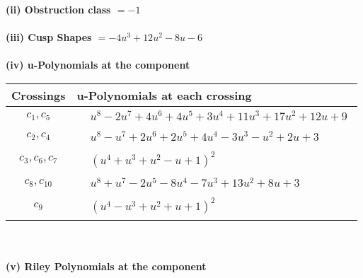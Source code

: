 \documentclass[1p]{elsarticle_modified}
\theoremstyle{definition}
\begin{document}
\flushleft \textbf{(ii) Obstruction class $= -1$}\\~\\
\flushleft \textbf{(iii) Cusp Shapes $= -4 u^3+12 u^2-8 u-6$}\\~\\
\newpage\renewcommand{\arraystretch}{1}
\flushleft \textbf{(iv) u-Polynomials at the component}\newline \\
\begin{tabular}{m{50pt}|m{274pt}}
Crossings & \hspace{64pt}u-Polynomials at each crossing \\
\hline $$\begin{aligned}c_{1},c_{5}\end{aligned}$$&$\begin{aligned}
&u^8-2 u^7+4 u^6+4 u^5+3 u^4+11 u^3+17 u^2+12 u+9
\end{aligned}$\\
\hline $$\begin{aligned}c_{2},c_{4}\end{aligned}$$&$\begin{aligned}
&u^8- u^7+2 u^6+2 u^5+4 u^4-3 u^3- u^2+2 u+3
\end{aligned}$\\
\hline $$\begin{aligned}c_{3},c_{6},c_{7}\end{aligned}$$&$\begin{aligned}
&(u^4+u^3+u^2- u+1)^2
\end{aligned}$\\
\hline $$\begin{aligned}c_{8},c_{10}\end{aligned}$$&$\begin{aligned}
&u^8+u^7-2 u^5-8 u^4-7 u^3+13 u^2+8 u+3
\end{aligned}$\\
\hline $$\begin{aligned}c_{9}\end{aligned}$$&$\begin{aligned}
&(u^4- u^3+u^2+u+1)^2
\end{aligned}$\\
\hline
\end{tabular}\\~\\
\newpage\renewcommand{\arraystretch}{1}
\flushleft \textbf{(v) Riley Polynomials at the component}\newline \\
\end{document}

